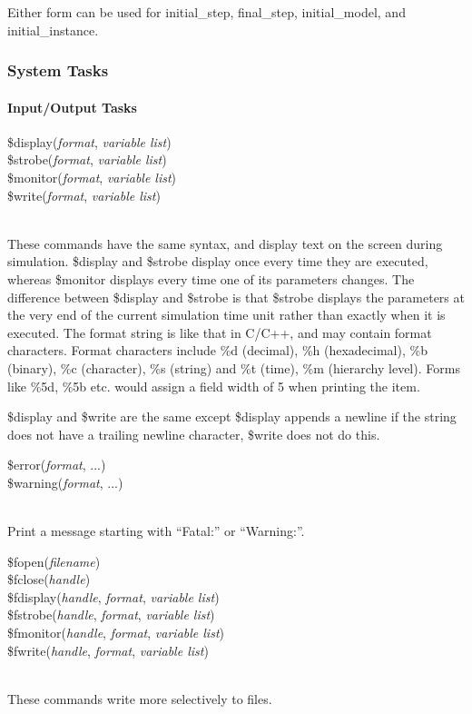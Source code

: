 Either form can be used for {\vt initial\_step}, {\vt final\_step},
{\vt initial\_model}, and {\vt initial\_instance}.

\subsubsection{System Tasks}

\paragraph{Input/Output Tasks}

\begin{description}
\item{\parbox{4in}{
{\vt \$display}({\it format\/}, {\it variable list\/})\\
{\vt \$strobe}({\it format\/}, {\it variable list\/})\\
{\vt \$monitor}({\it format\/}, {\it variable list\/})\\
{\vt \$write}({\it format\/}, {\it variable list\/})}}\\
These commands have the same syntax, and display text on the screen
during simulation.  {\vt \$display} and {\vt \$strobe} display once
every time they are executed, whereas {\vt \$monitor} displays every
time one of its parameters changes.  The difference between {\vt
\$display} and {\vt \$strobe} is that {\vt \$strobe} displays the
parameters at the very end of the current simulation time unit rather
than exactly when it is executed.  The format string is like that in
C/C++, and may contain format characters.  Format characters include
{\vt \%d} (decimal), {\vt \%h} (hexadecimal), {\vt \%b} (binary), {\vt
\%c} (character), {\vt \%s} (string) and {\vt \%t} (time), {\vt \%m}
(hierarchy level).  Forms like {\vt \%5d}, {\vt \%5b} etc.  would
assign a field width of 5 when printing the item.

{\vt \$display} and {\vt \$write} are the same except {\vt \$display}
appends a newline if the string does not have a trailing newline
character, {\vt \$write} does not do this.

\item{\parbox{4in}{
{\vt \$error}({\it format\/}, ...)\\
{\vt \$warning}({\it format\/}, ...)}}\\
Print a message starting with ``{\vt Fatal:}'' or ``{\vt Warning:}''.

\item{\parbox{4in}{
{\vt \$fopen}({\it filename\/})\\
{\vt \$fclose}({\it handle\/})\\
{\vt \$fdisplay}({\it handle\/}, {\it format\/}, {\it variable list\/})\\
{\vt \$fstrobe}({\it handle\/}, {\it format\/}, {\it variable list\/})\\
{\vt \$fmonitor}({\it handle\/}, {\it format\/}, {\it variable list\/})\\
{\vt \$fwrite}({\it handle\/}, {\it format\/}, {\it variable list\/})}}\\
These commands write more selectively to files.


\end{description}
